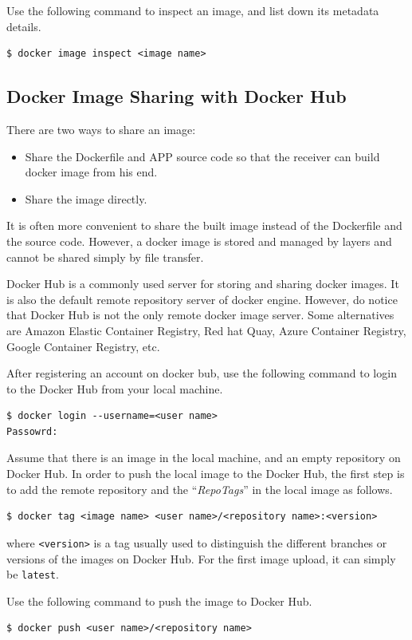 Use the following command to inspect an image, and list down its metadata details.
\begin{lstlisting}
$ docker image inspect <image name>
\end{lstlisting}

\subsection{Docker Image Sharing with Docker Hub}

There are two ways to share an image:
\begin{itemize}
	\item Share the Dockerfile and APP source code so that the receiver can build docker image from his end.
	\item Share the image directly.
\end{itemize}
It is often more convenient to share the built image instead of the Dockerfile and the source code. However, a docker image is stored and managed by layers and cannot be shared simply by file transfer. 

Docker Hub is a commonly used server for storing and sharing docker images. It is also the default remote repository server of docker engine. However, do notice that Docker Hub is not the only remote docker image server. Some alternatives are Amazon Elastic Container Registry, Red hat Quay, Azure Container Registry, Google Container Registry, etc.

After registering an account on docker bub, use the following command to login to the Docker Hub from your local machine.
\begin{lstlisting}
$ docker login --username=<user name>
Passowrd:
\end{lstlisting}

Assume that there is an image in the local machine, and an empty repository on Docker Hub. In order to push the local image to the Docker Hub, the first step is to add the remote repository and the ``\textit{RepoTags}'' in the local image as follows.
\begin{lstlisting}
$ docker tag <image name> <user name>/<repository name>:<version>
\end{lstlisting}
where \verb|<version>| is a tag usually used to distinguish the different branches or versions of the images on Docker Hub. For the first image upload, it can simply be \verb|latest|.

Use the following command to push the image to Docker Hub.
\begin{lstlisting}
$ docker push <user name>/<repository name>
\end{lstlisting}

